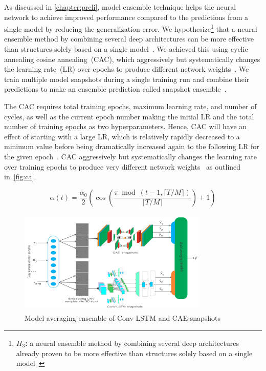 \hspace*{3.5mm} As discussed in \cref{chapter:preli}, model ensemble technique helps the neural network to achieve improved performance compared to the predictions from a single model by reducing the generalization error. We hypothesize\footnote{\textbf{$H_3$:} a neural ensemble method by combining several deep architectures already proven to be more effective than structures solely based on a single model~\cite{karimACCA2019}} that a neural ensemble method by combining several deep architectures can be more effective than structures solely based on a single model~\cite{karimACCA2019}. We achieved this using cyclic annealing cosine annealing~(CAC), which aggressively but systematically changes the learning rate~(LR) over epochs to produce different network weights~\cite{loshchilov2016sgdr}. We train multiple model snapshots during a single training run and combine their predictions to make an ensemble prediction called snapshot ensemble~\cite{huang2017snapshot}. 

\hspace*{3.5mm} The CAC requires total training epochs, maximum learning rate, and number of cycles, as well as the current epoch number making the initial LR and the total number of training epochs as two hyperparameters. Hence, CAC will have an effect of starting with a large LR, which is relatively rapidly decreased to a minimum value before being dramatically increased again to the following LR for the given epoch~\cite{huang2017snapshot}. CAC aggressively but systematically changes the learning rate over training epochs to produce very different network weights~\cite{loshchilov2016sgdr} as outlined in~\cref{fig:ca}. 

\begin{equation}
    \label{eq:lr-cosine}
    \alpha(t)=\frac{\alpha_{0}}{2}\left(\cos \left(\frac{\pi \bmod (t-1,\lceil T / M\rceil)}{\lceil T / M\rceil}\right)+1\right)
\end{equation}

\begin{figure}
    \centering
        \includegraphics[width=0.8\textwidth,height=50mm]{images/mae_model_v2.png}
    \caption{Model averaging ensemble of Conv-LSTM and CAE snapshots~\cite{karimACCA2019}}
    \label{fig:mae}
    \vspace{-2mm}
\end{figure}


